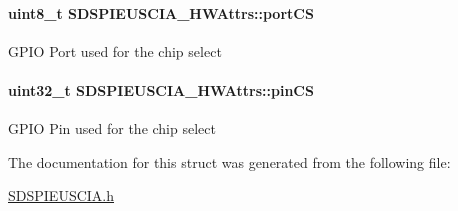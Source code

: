 \paragraph[{port\-C\-S}]{\setlength{\rightskip}{0pt plus 5cm}uint8\-\_\-t S\-D\-S\-P\-I\-E\-U\-S\-C\-I\-A\-\_\-\-H\-W\-Attrs\-::port\-C\-S}\label{struct_s_d_s_p_i_e_u_s_c_i_a___h_w_attrs_a669ad55ec90fcc5c37c13b86f23bad1c}
G\-P\-I\-O Port used for the chip select 
\paragraph[{pin\-C\-S}]{\setlength{\rightskip}{0pt plus 5cm}uint32\-\_\-t S\-D\-S\-P\-I\-E\-U\-S\-C\-I\-A\-\_\-\-H\-W\-Attrs\-::pin\-C\-S}\label{struct_s_d_s_p_i_e_u_s_c_i_a___h_w_attrs_acc7a51ef098ed1cc7ef4d930fcd2aada}
G\-P\-I\-O Pin used for the chip select 

The documentation for this struct was generated from the following file\-:\begin{DoxyCompactItemize}
\item 
\hyperlink{_s_d_s_p_i_e_u_s_c_i_a_8h}{S\-D\-S\-P\-I\-E\-U\-S\-C\-I\-A.\-h}\end{DoxyCompactItemize}
